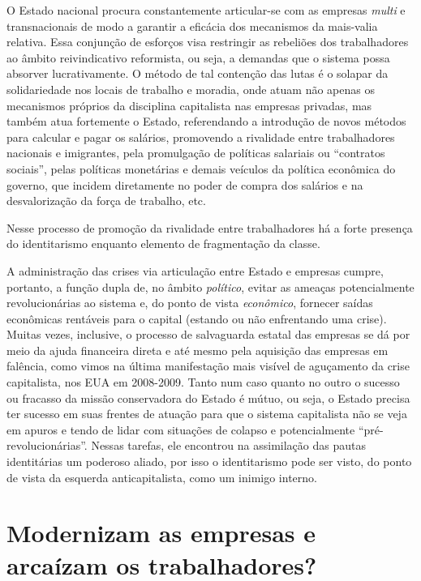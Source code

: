 O Estado nacional procura constantemente articular-se com as empresas
\emph{multi} e transnacionais de modo a garantir a eficácia dos
mecanismos da mais-valia relativa. Essa conjunção de esforços visa
restringir as rebeliões dos trabalhadores ao âmbito reivindicativo
reformista, ou seja, a demandas que o sistema possa absorver
lucrativamente. O método de tal contenção das lutas é o solapar da
solidariedade nos locais de trabalho e moradia, onde atuam não apenas os
mecanismos próprios da disciplina capitalista nas empresas privadas, mas
também atua fortemente o Estado, referendando a introdução de novos
métodos para calcular e pagar os salários, promovendo a rivalidade entre
trabalhadores nacionais e imigrantes, pela promulgação de políticas
salariais ou ``contratos sociais'', pelas políticas monetárias e demais
veículos da política econômica do governo, que incidem diretamente no
poder de compra dos salários e na desvalorização da força de trabalho,
etc.

Nesse processo de promoção da rivalidade entre trabalhadores há a forte
presença do identitarismo enquanto elemento de fragmentação da classe.

A administração das crises via articulação entre Estado e empresas
cumpre, portanto, a função dupla de, no âmbito \emph{político}, evitar
as ameaças potencialmente revolucionárias ao sistema e, do ponto de
vista \emph{econômico}, fornecer saídas econômicas rentáveis para o
capital (estando ou não enfrentando uma crise). Muitas vezes, inclusive,
o processo de salvaguarda estatal das empresas se dá por meio da ajuda
financeira direta e até mesmo pela aquisição das empresas em falência,
como vimos na última manifestação mais visível de aguçamento da crise
capitalista, nos EUA em 2008-2009. Tanto num caso quanto no outro o
sucesso ou fracasso da missão conservadora do Estado é mútuo, ou seja, o
Estado precisa ter sucesso em suas frentes de atuação para que o sistema
capitalista não se veja em apuros e tendo de lidar com situações de
colapso e potencialmente ``pré-revolucionárias''. Nessas tarefas, ele
encontrou na assimilação das pautas identitárias um poderoso aliado, por
isso o identitarismo pode ser visto, do ponto de vista da esquerda
anticapitalista, como um inimigo interno.

\chapter{Modernizam as empresas e arcaízam os trabalhadores?}

